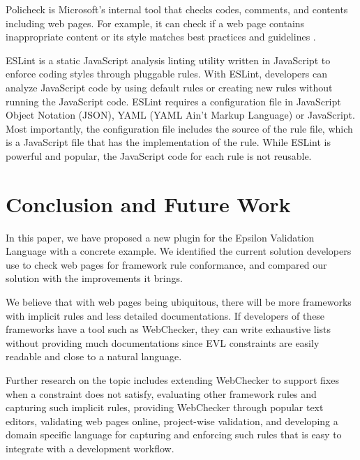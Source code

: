 \documentclass[conference]{IEEETran}
\begin{document}
Policheck is Microsoft's internal tool that checks codes, comments, and contents including web pages. For example, it can check if a web page contains inappropriate content or its style matches best practices and guidelines \cite{christakis16}.

ESLint \cite{eslint} is a static JavaScript analysis linting utility written in JavaScript to enforce coding styles through pluggable rules. With ESLint, developers can analyze JavaScript code by using default rules or creating new rules without running the JavaScript code. ESLint requires a configuration file in JavaScript Object Notation (JSON), YAML (YAML Ain't Markup Language) or JavaScript. Most importantly, the configuration file includes the source of the rule file, which is a JavaScript file that has the implementation of the rule. While ESLint is powerful and popular, the JavaScript code for each rule is not reusable.    
 


\section{Conclusion and Future Work}

In this paper, we have proposed a new plugin for the Epsilon Validation Language with a concrete example. We identified the current solution developers use to check web pages for framework rule conformance, and compared our solution with the improvements it brings. 

We believe that with web pages being ubiquitous, there will be more frameworks with implicit rules and less detailed documentations. If developers of these frameworks have a tool such as WebChecker, they can write exhaustive lists without providing much documentations since EVL constraints are easily readable and close to a natural language. 

Further research on the topic includes extending WebChecker to support fixes when a constraint does not satisfy, evaluating other framework rules and capturing such implicit rules, providing WebChecker through popular text editors, validating web pages online, project-wise validation, and developing a domain specific language for capturing and enforcing such rules that is easy to integrate with a development workflow.


 
\end{document}
